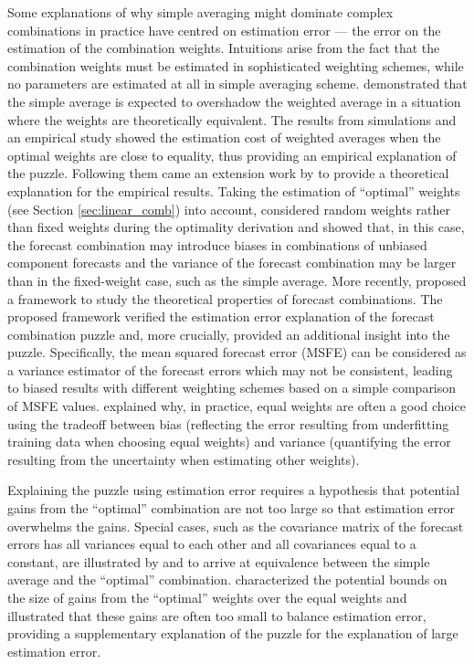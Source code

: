 \documentclass[11pt]{article}
\begin{document}
Some explanations of why simple averaging might dominate complex combinations in practice have centred on estimation error --- the error on the estimation of the combination weights. Intuitions arise from the fact that the combination weights must be estimated in sophisticated weighting schemes, while no parameters are estimated at all in simple averaging scheme. \citet{Smith2009-wd} demonstrated that the simple average is expected to overshadow the weighted average in a situation where the weights are theoretically equivalent. The results from simulations and an empirical study showed the estimation cost of weighted averages when the optimal weights are close to equality, thus providing an empirical explanation of the puzzle. Following them came an extension work by \citet{Claeskens2016-pv} to provide a theoretical explanation for the empirical results. Taking the estimation of ``optimal'' weights (see Section \ref{sec:linear_comb}) into account, \citet{Claeskens2016-pv} considered random weights rather than fixed weights during the optimality derivation and showed that, in this case, the forecast combination may introduce biases in combinations of unbiased component forecasts and the variance of the forecast combination may be larger than in the fixed-weight case, such as the simple average. More recently, \citet{Chan2018-jl} proposed a framework to study the theoretical properties of forecast combinations. The proposed framework verified the estimation error explanation of the forecast combination puzzle and, more crucially, provided an additional insight into the puzzle. Specifically, the mean squared forecast error (MSFE) can be considered as a variance estimator of the forecast errors which may not be consistent, leading to biased results with different weighting schemes based on a simple comparison of MSFE values. \citet{Blanc2020-pg} explained why, in practice, equal weights are often a good choice using the tradeoff between bias (reflecting the error resulting from underfitting training data when choosing equal weights) and variance (quantifying the error resulting from the uncertainty when estimating other weights).

Explaining the puzzle using estimation error requires a hypothesis that potential gains from the ``optimal'' combination are not too large so that estimation error overwhelms the gains. Special cases, such as the covariance matrix of the forecast errors has all variances equal to each other and all covariances equal to a constant, are illustrated by \citet{Timmermann2006-en} and \citet{Hsiao2014-ug} to arrive at equivalence between the simple average and the ``optimal'' combination. \citet{Elliott2011-ab} characterized the potential bounds on the size of gains from the ``optimal'' weights over the equal weights and illustrated that these gains are often too small to balance estimation error, providing a supplementary explanation of the puzzle for the explanation of large estimation error.
\end{document}
